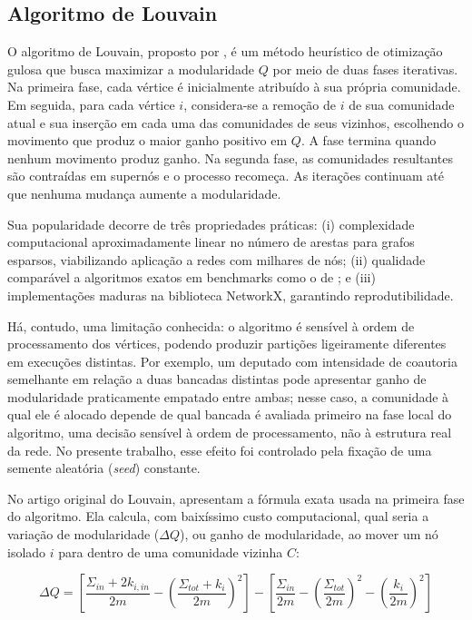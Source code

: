\documentclass[
      12pt,
      a4paper,
      openright,
      oneside,
      chapter=TITLE,
      section=TITLE,
      english,
      french,
      spanish,
      brazilian
    ]{abntex2}
\begin{document}
    \subsection{Algoritmo de Louvain}
    
    O algoritmo de Louvain, proposto por , é um método heurístico de otimização gulosa que busca maximizar a modularidade $Q$ por meio de duas fases iterativas. Na primeira fase, cada vértice é inicialmente atribuído à sua própria comunidade. Em seguida, para cada vértice $i$, considera-se a remoção de $i$ de sua comunidade atual e sua inserção em cada uma das comunidades de seus vizinhos, escolhendo o movimento que produz o maior ganho positivo em $Q$. A fase termina quando nenhum movimento produz ganho. Na segunda fase, as comunidades resultantes são contraídas em supernós e o processo recomeça. As iterações continuam até que nenhuma mudança aumente a modularidade.
    
    Sua popularidade decorre de três propriedades práticas: (i) complexidade computacional aproximadamente linear no número de arestas para grafos esparsos, viabilizando aplicação a redes com milhares de nós; (ii) qualidade comparável a algoritmos exatos em benchmarks como o de ; e (iii) implementações maduras na biblioteca NetworkX, garantindo reprodutibilidade.
    
    Há, contudo, uma limitação conhecida: o algoritmo é sensível à ordem de processamento dos vértices, podendo produzir partições ligeiramente diferentes em execuções distintas. Por
    exemplo, um deputado com intensidade de coautoria semelhante em relação a duas bancadas
    distintas pode apresentar ganho de modularidade praticamente empatado entre ambas; nesse
    caso, a comunidade à qual ele é alocado depende de qual bancada é avaliada primeiro na
    fase local do algoritmo, uma decisão sensível à ordem de processamento, não à estrutura
    real da rede. No presente trabalho, esse efeito foi controlado pela fixação de uma semente aleatória (\textit{seed}) constante.
    
    No artigo original do Louvain,  apresentam a fórmula exata usada na primeira fase do algoritmo. Ela calcula, com baixíssimo custo computacional, qual seria a variação de modularidade ($\Delta Q$), ou ganho de modularidade, ao mover um nó isolado $i$ para dentro de uma comunidade vizinha $C$:
    
    \begin{equation}
    \Delta Q = \left[ \frac{\Sigma_{in} + 2k_{i,in}}{2m} - \left( \frac{\Sigma_{tot} + k_i}{2m} \right)^2 \right] - \left[ \frac{\Sigma_{in}}{2m} - \left( \frac{\Sigma_{tot}}{2m} \right)^2 - \left( \frac{k_i}{2m} \right)^2 \right]
    \label{eq:delta_q}
    \end{equation}
    
\end{document}
